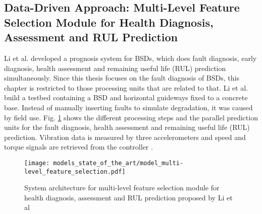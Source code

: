 \subsection{Data-Driven Approach: Multi-Level Feature Selection Module for Health Diagnosis, Assessment and RUL Prediction}
Li et al. \cite{LiPin2018} developed a prognosis system for BSDs, which does fault diagnosis, early diagnosis, health assessment and remaining useful life (RUL) prediction simultaneously. Since this thesis focuses on the fault diagnosis of BSDs, this chapter is restricted  to those processing units that are related to that. Li et al. build a testbed containing a BSD and horizontal guideways fixed to a concrete base. Instead of manually inserting faults to simulate degradation, it was caused by field use. Fig.  \ref{fig:level_feature_selection_model} shows the different processing steps and the parallel prediction units for the fault diagnosis, health assessment and remaining useful life (RUL) prediction. Vibration data is measured by three accelerometers and speed and torque signals are retrieved from the controller \cite{LiPin2018}. 

\begin{figure}[H]
  \centering
  \texttt{[image: models\_state\_of\_the\_art/model\_multi-level\_feature\_selection.pdf]}
  \caption{System architecture for multi-level feature selection module for health diagnosis, assessment and RUL prediction proposed by Li et al \cite{LiPin2018}}
  \label{fig:level_feature_selection_model}
\end{figure}

